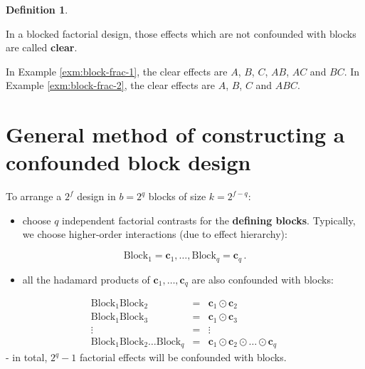 \documentclass[
]{book}
\providecommand{\tightlist}{%
  \setlength{\itemsep}{0pt}\setlength{\parskip}{0pt}}
\theoremstyle{definition}
\newtheorem{definition}{Definition}[chapter]
\theoremstyle{definition}
\theoremstyle{definition}
\theoremstyle{definition}
\theoremstyle{remark}
\begin{document}
\begin{definition}
\protect\hypertarget{def:block-clear-effects}{}\label{def:block-clear-effects}

In a blocked factorial design, those effects which are not confounded with blocks are called \textbf{clear}.

\end{definition}

In Example \ref{exm:block-frac-1}, the clear effects are \(A\), \(B\), \(C\), \(AB\), \(AC\) and \(BC\). In Example \ref{exm:block-frac-2}, the clear effects are \(A\), \(B\), \(C\) and \(ABC\).

\hypertarget{general-method-of-constructing-a-confounded-block-design}{%
\section{General method of constructing a confounded block design}\label{general-method-of-constructing-a-confounded-block-design}}

To arrange a \(2^{f}\) design in \(b=2^{q}\) blocks of size \(k=2^{f-q}\):

\begin{itemize}
\tightlist
\item
  choose \(q\) independent factorial contrasts for the \textbf{defining blocks}. Typically, we choose higher-order interactions (due to effect hierarchy):
\end{itemize}

\[
\mathrm{Block}_{1}=\boldsymbol{c}_{1},\ldots,\mathrm{Block}_{q} = \boldsymbol{c}_{q}\,.
\]

\begin{itemize}
\tightlist
\item
  all the hadamard products of \(\boldsymbol{c}_{1},\dots,\boldsymbol{c}_{q}\) are also confounded with blocks:
\end{itemize}

\[
\begin{array}{ccc}
\mathrm{Block}_{1}\mathrm{Block}_{2}&=&\boldsymbol{c}_{1}\odot\boldsymbol{c}_{2} \\
\mathrm{Block}_{1}\mathrm{Block}_{3}&=&\boldsymbol{c}_{1}\odot\boldsymbol{c}_{3} \\
\vdots&=&\vdots\\
\mathrm{Block}_{1}\mathrm{Block}_{2}\dots \mathrm{Block}_{q}&=&\boldsymbol{c}_{1}\odot\boldsymbol{c}_{2}\odot\dots\odot \boldsymbol{c}_{q}\
\end{array}
\]
- in total, \(2^q -1\) factorial effects will be confounded with blocks.
\end{document}
